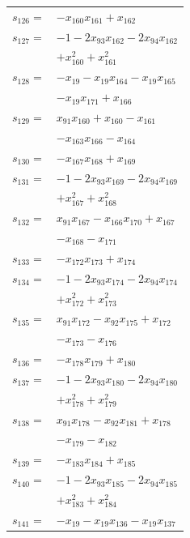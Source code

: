 \begin{longtable}{@{}r@{\;}l@{}}
\(s_{126}=\) & \(\displaystyle -x_{160}x_{161} +x_{162}\) \\[3pt]
\(s_{127}=\) & \(\displaystyle -1 -2x_{93}x_{162} -2x_{94}x_{162}\) \\
 & \(\displaystyle +x_{160}^{2} +x_{161}^{2}\) \\[3pt]
\(s_{128}=\) & \(\displaystyle -x_{19} -x_{19}x_{164} -x_{19}x_{165}\) \\
 & \(\displaystyle -x_{19}x_{171} +x_{166}\) \\[3pt]
\(s_{129}=\) & \(\displaystyle x_{91}x_{160} +x_{160} -x_{161}\) \\
 & \(\displaystyle -x_{163}x_{166} -x_{164}\) \\[3pt]
\(s_{130}=\) & \(\displaystyle -x_{167}x_{168} +x_{169}\) \\[3pt]
\(s_{131}=\) & \(\displaystyle -1 -2x_{93}x_{169} -2x_{94}x_{169}\) \\
 & \(\displaystyle +x_{167}^{2} +x_{168}^{2}\) \\[3pt]
\(s_{132}=\) & \(\displaystyle x_{91}x_{167} -x_{166}x_{170} +x_{167}\) \\
 & \(\displaystyle -x_{168} -x_{171}\) \\[3pt]
\(s_{133}=\) & \(\displaystyle -x_{172}x_{173} +x_{174}\) \\[3pt]
\(s_{134}=\) & \(\displaystyle -1 -2x_{93}x_{174} -2x_{94}x_{174}\) \\
 & \(\displaystyle +x_{172}^{2} +x_{173}^{2}\) \\[3pt]
\(s_{135}=\) & \(\displaystyle x_{91}x_{172} -x_{92}x_{175} +x_{172}\) \\
 & \(\displaystyle -x_{173} -x_{176}\) \\[3pt]
\(s_{136}=\) & \(\displaystyle -x_{178}x_{179} +x_{180}\) \\[3pt]
\(s_{137}=\) & \(\displaystyle -1 -2x_{93}x_{180} -2x_{94}x_{180}\) \\
 & \(\displaystyle +x_{178}^{2} +x_{179}^{2}\) \\[3pt]
\(s_{138}=\) & \(\displaystyle x_{91}x_{178} -x_{92}x_{181} +x_{178}\) \\
 & \(\displaystyle -x_{179} -x_{182}\) \\[3pt]
\(s_{139}=\) & \(\displaystyle -x_{183}x_{184} +x_{185}\) \\[3pt]
\(s_{140}=\) & \(\displaystyle -1 -2x_{93}x_{185} -2x_{94}x_{185}\) \\
 & \(\displaystyle +x_{183}^{2} +x_{184}^{2}\) \\[3pt]
\(s_{141}=\) & \(\displaystyle -x_{19} -x_{19}x_{136} -x_{19}x_{137}\) \\

\end{longtable}
